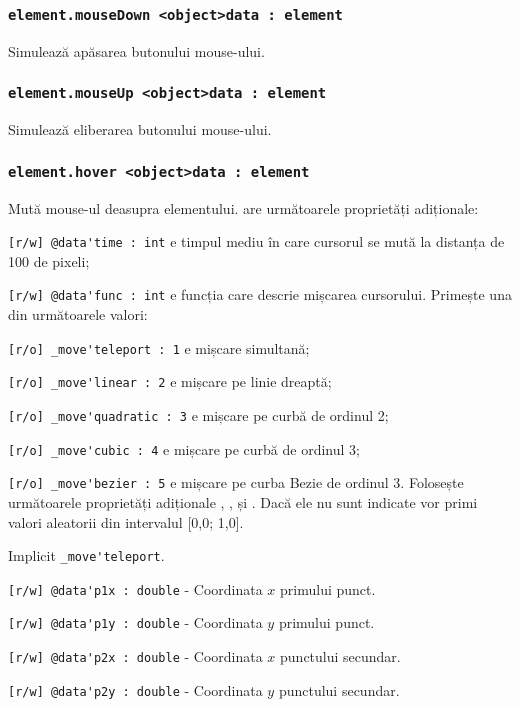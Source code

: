 \subsubsection{\lstinline|element.mouseDown <object>data : element|}

Simulează apăsarea butonului mouse-ului.

\subsubsection{\lstinline|element.mouseUp <object>data : element|}

Simulează eliberarea butonului mouse-ului.

\subsubsection{\lstinline|element.hover <object>data : element|}

Mută mouse-ul deasupra elementului.  are următoarele proprietăți adiționale:
\begin{icItems}
	\item \lstinline|[r/w] @data'time : int| e timpul mediu în care cursorul se mută la distanța de 100 de pixeli;
	\item \lstinline|[r/w] @data'func : int| e funcția care descrie mișcarea cursorului. Primește una din următoarele valori:
	\begin{icItems}
		\item \lstinline|[r/o] _move'teleport : 1| e mișcare simultană;
		\item \lstinline|[r/o] _move'linear : 2| e mișcare pe linie dreaptă;
		\item \lstinline|[r/o] _move'quadratic : 3| e mișcare pe curbă de ordinul 2;
		\item \lstinline|[r/o] _move'cubic : 4| e mișcare pe curbă de ordinul 3;
		\item \lstinline|[r/o] _move'bezier : 5| e mișcare pe curba Bezie de ordinul 3. Folosește următoarele proprietăți adiționale , ,  și . Dacă ele nu sunt indicate vor primi valori aleatorii din intervalul [0,0; 1,0].
	\end{icItems}
	Implicit \lstinline|_move'teleport|.
	\item \lstinline|[r/w] @data'p1x : double| - Coordinata $x$ primului punct.
	\item \lstinline|[r/w] @data'p1y : double| - Coordinata $y$ primului punct.
	\item \lstinline|[r/w] @data'p2x : double| - Coordinata $x$ punctului secundar.
	\item \lstinline|[r/w] @data'p2y : double| - Coordinata $y$ punctului secundar.
\end{icItems}

